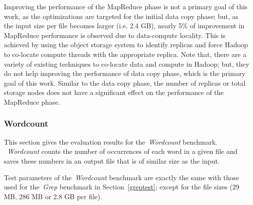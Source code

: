 Improving the performance of the MapReduce phase is not a primary goal of this work, as the
optimizations are targeted for the initial data copy phase; but, as the input size per file
becomes larger (i.e. 2.4 GB), nearly 5\% of improvement in MapReduce performance is observed
due to data-compute locality. This is achieved by using the object storage system to identify
replicas and force Hadoop to co-locate compute threads with the appropriate replica. Note that,
there are a variety of existing techniques to co-locate data and compute in Hadoop; but, they
do not help improving the performance of data copy phase, which is the primary goal of this work.
Similar to the data copy phase, the number of replicas or total storage nodes does not have a
significant effect on the performance of the MapReduce phase.

\subsubsection{Wordcount}
This section gives the evaluation results for the~\textit{Wordcount} benchmark.
~\textit{Wordcount} counts the number of occurrences of each word in a given file and
saves these numbers in an output file that is of similar size as the input.

Test parameters of the~\textit{Wordcount} benchmark are exactly the same
with those used for the~\textit{Grep} benchmark in Section~\ref{greptest};
except for the file sizes (29 MB, 286 MB or 2.8 GB per file).

